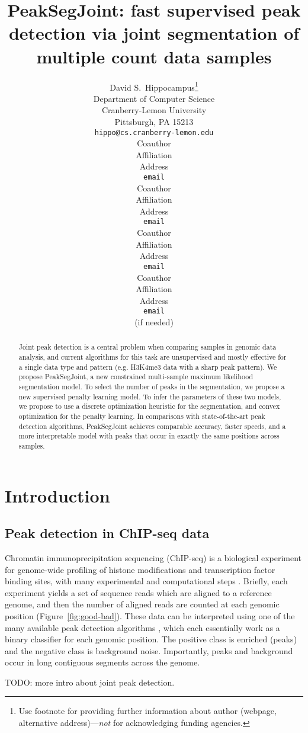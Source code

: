 \documentclass{article} %
\title{PeakSegJoint: fast supervised peak detection via joint
  segmentation of multiple count data samples}
\author{
David S.~Hippocampus\thanks{ Use footnote for providing further information
about author (webpage, alternative address)---\emph{not} for acknowledging
funding agencies.} \\
Department of Computer Science\\
Cranberry-Lemon University\\
Pittsburgh, PA 15213 \\
\texttt{hippo@cs.cranberry-lemon.edu} \\
\And
Coauthor \\
Affiliation \\
Address \\
\texttt{email} \\
\AND
Coauthor \\
Affiliation \\
Address \\
\texttt{email} \\
\And
Coauthor \\
Affiliation \\
Address \\
\texttt{email} \\
\And
Coauthor \\
Affiliation \\
Address \\
\texttt{email} \\
(if needed)\\
}
\begin{document}
\maketitle

\begin{abstract}
  Joint peak detection is a central problem when comparing samples in
  genomic data analysis, and current algorithms for this task are
  unsupervised and mostly effective for a single data type and pattern
  (e.g. H3K4me3 data with a sharp peak pattern). We propose
  PeakSegJoint, a new constrained multi-sample maximum likelihood
  segmentation model. To select the number of peaks in the
  segmentation, we propose a new supervised penalty learning model. To
  infer the parameters of these two models, we propose to use a
  discrete optimization heuristic for the segmentation, and convex
  optimization for the penalty learning. In comparisons with
  state-of-the-art peak detection algorithms, PeakSegJoint achieves
  comparable accuracy, faster speeds, and a more interpretable model
  with peaks that occur in exactly the same positions across samples.
\end{abstract}

\section{Introduction}

\subsection{Peak detection in ChIP-seq data}

Chromatin immunoprecipitation sequencing (ChIP-seq) is a biological
experiment for genome-wide profiling of histone modifications and
transcription factor binding sites, with many experimental and
computational steps \citep{practical}. Briefly, each experiment yields
a set of sequence reads which are aligned to a reference genome, and
then the number of aligned reads are counted at each genomic position
(Figure~\ref{fig:good-bad}). These data can be interpreted using
one of the many available peak detection algorithms
\citep{evaluation2010, rye2010manually, chip-seq-bench}, which each
essentially work as a binary classifier for each genomic position. The
positive class is enriched (peaks) and the negative class is
background noise. Importantly, peaks and background occur in long
contiguous segments across the genome.

TODO: more intro about joint peak detection.
\end{document}
